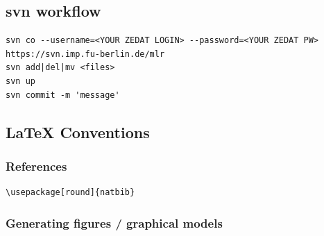 \subsection{svn workflow}

\begin{code}
\begin{verbatim}
svn co --username=<YOUR ZEDAT LOGIN> --password=<YOUR ZEDAT PW> https://svn.imp.fu-berlin.de/mlr
svn add|del|mv <files>
svn up
svn commit -m 'message'
\end{verbatim}
\end{code}



\subsection{LaTeX Conventions}

\subsubsection{References}

\begin{code}
\begin{verbatim}
\usepackage[round]{natbib}

\end{verbatim}
\end{code}

\subsubsection{Generating figures / graphical models}

